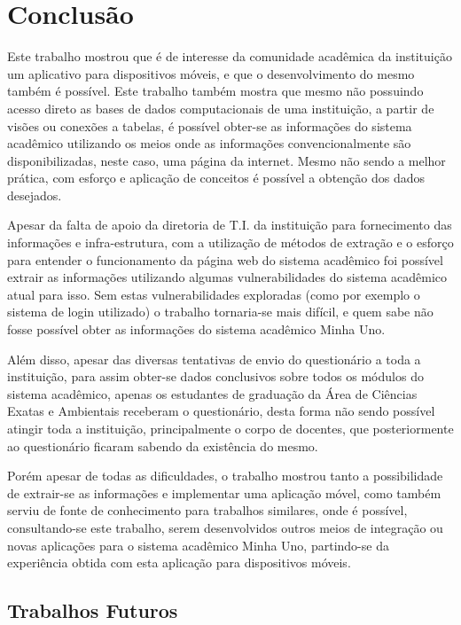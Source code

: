 \chapter{Conclusão}

Este trabalho mostrou que é de interesse da comunidade acadêmica da instituição um aplicativo para dispositivos móveis, e que o desenvolvimento do mesmo também é possível. Este trabalho também mostra que mesmo não possuindo acesso direto as bases de dados computacionais de uma instituição, a partir de visões ou conexões a tabelas, é possível obter-se as informações do sistema acadêmico utilizando os meios onde as informações convencionalmente são disponibilizadas, neste caso, uma página da internet. Mesmo não sendo a melhor prática, com esforço e aplicação de conceitos é possível a obtenção dos dados desejados.

Apesar da falta de apoio da diretoria de T.I. da instituição para fornecimento das informações e infra-estrutura, com a utilização de métodos de extração e o esforço para entender o funcionamento da página web do sistema acadêmico foi possível extrair as informações utilizando algumas vulnerabilidades do sistema acadêmico atual para isso. Sem estas vulnerabilidades exploradas (como por exemplo o sistema de login utilizado) o trabalho tornaria-se mais difícil, e quem sabe não fosse possível obter as informações do sistema acadêmico Minha Uno.

Além disso, apesar das diversas tentativas de envio do questionário a toda a instituição, para assim obter-se dados conclusivos sobre todos os módulos do sistema acadêmico, apenas os estudantes de graduação da Área de Ciências Exatas e Ambientais receberam o questionário, desta forma não sendo possível atingir toda a instituição, principalmente o corpo de docentes, que posteriormente ao questionário ficaram sabendo da existência do mesmo.

Porém apesar de todas as dificuldades, o trabalho mostrou tanto a possibilidade de extrair-se as informações e implementar uma aplicação móvel, como também serviu de fonte de conhecimento para trabalhos similares, onde é possível, consultando-se este trabalho, serem desenvolvidos outros meios de integração ou novas aplicações para o sistema acadêmico Minha Uno, partindo-se da experiência obtida com esta aplicação para dispositivos móveis.

\section{Trabalhos Futuros}


